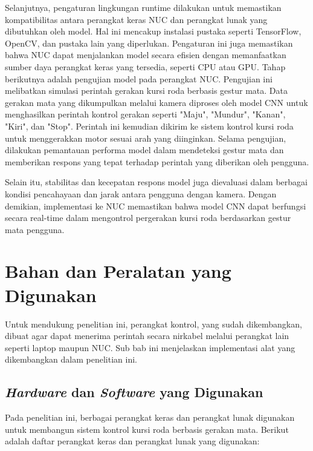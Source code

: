 Selanjutnya, pengaturan lingkungan runtime dilakukan untuk memastikan kompatibilitas antara perangkat keras NUC dan perangkat lunak yang dibutuhkan oleh model. Hal ini mencakup instalasi pustaka seperti TensorFlow, OpenCV, dan pustaka lain yang diperlukan. Pengaturan ini juga memastikan bahwa NUC dapat menjalankan model secara efisien dengan memanfaatkan sumber daya perangkat keras yang tersedia, seperti CPU atau GPU. Tahap berikutnya adalah pengujian model pada perangkat NUC. Pengujian ini melibatkan simulasi perintah gerakan kursi roda berbasis gestur mata. Data gerakan mata yang dikumpulkan melalui kamera diproses oleh model CNN untuk menghasilkan perintah kontrol gerakan seperti "Maju", "Mundur", "Kanan", "Kiri", dan "Stop". Perintah ini kemudian dikirim ke sistem kontrol kursi roda untuk menggerakkan motor sesuai arah yang diinginkan. Selama pengujian, dilakukan pemantauan performa model dalam mendeteksi gestur mata dan memberikan respons yang tepat terhadap perintah yang diberikan oleh pengguna.

Selain itu, stabilitas dan kecepatan respons model juga dievaluasi dalam berbagai kondisi pencahayaan dan jarak antara pengguna dengan kamera. Dengan demikian, implementasi ke NUC memastikan bahwa model CNN dapat berfungsi secara real-time dalam mengontrol pergerakan kursi roda berdasarkan gestur mata pengguna.

\newpage

\section{Bahan dan Peralatan yang Digunakan}

Untuk mendukung penelitian ini, perangkat kontrol, yang sudah dikembangkan, dibuat agar dapat menerima perintah secara nirkabel melalui perangkat lain seperti laptop maupun NUC. Sub bab ini menjelaskan implementasi alat yang dikembangkan dalam penelitian ini.

\subsection{\emph{Hardware} dan \emph{Software} yang Digunakan}
\label{sec:hardware dan software}

Pada penelitian ini, berbagai perangkat keras dan perangkat lunak digunakan untuk membangun sistem kontrol kursi roda berbasis gerakan mata. Berikut adalah daftar perangkat keras dan perangkat lunak yang digunakan:

